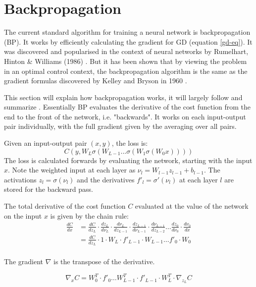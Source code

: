 \section{Backpropagation}
The current standard algorithm for training a neural network is backpropagation (BP). It works by efficiently calculating the gradient for GD (equation \ref{gd-eq}). It was discovered and popularised in the context of neural networks by Rumelhart, Hinton \& Williams (1986) \cite{Rumelhart1986}. But it has been shown that by viewing the problem in an optimal control context, the backpropagation algorithm is the same as the gradient formulas discovered by Kelley and Bryson in 1960 \cite{dreyfus1990}.

This section will explain how backpropagation works, it will largely follow and summarize \cite{Nielsen2015}. Essentially BP evaluates the derivative of the cost function from the end to the front of the network, i.e. "backwards". It works on each input-output pair individually, with the full gradient given by the averaging over all pairs.

Given an input-output pair $(x,y)$, the loss is:
\begin{equation}
C(y,W_L\sigma(W_{L-1}...\sigma(W_1\sigma(W_0x))))
\end{equation}
The loss is calculated forwards by evaluating the network, starting with the input $x$. Note the weighted input at each layer as $\nu_l = W_{l-1}z_{l-1} + b_{l-1}$. The activations $z_l = \sigma(\nu_l)$ and the derivatives $f'_l = \sigma'(\nu_l)$ at each layer $l$ are stored for the backward pass.

The total derivative of the cost function $C$ evaluated at the value of the network on the input $x$ is given by the chain rule:
\begin{equation}
	\begin{aligned}
	\frac{dC}{dx} &= \frac{dC}{dz_L}\cdot \frac{dz_L}{d\nu_L}\cdot \frac{d\nu_L}{dz_{L-1}}\cdot \frac{dz_{L-1}}{d\nu_{L-1}} \cdot \frac{d\nu_{L-1}}{dz_{L-2}}\dots\frac{dz_0}{d\nu_0}\cdot\frac{d\nu_0}{dx} \\
	&= \frac{dC}{dz_L}\cdot 1 \cdot W_L \cdot f'_{L-1} \cdot W_{L-1} \dots f'_0 \cdot W_0 \\
	\end{aligned}
\end{equation}

The gradient $\nabla$ is the transpose of the derivative.

\begin{equation}
\nabla_xC = W_0^T \cdot f'_0 \dots W_{L-1}^T \cdot f'_{L-1} \cdot W_L^T \cdot \nabla_{z_L}C
\end{equation}


